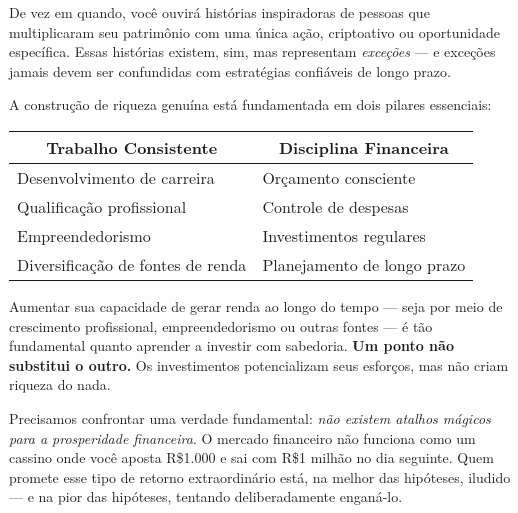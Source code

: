 \vspace{0.5cm}
\noindent De vez em quando, você ouvirá histórias inspiradoras de pessoas que multiplicaram seu patrimônio com uma única ação, criptoativo ou oportunidade específica. Essas histórias existem, sim, mas representam \textit{exceções} — e exceções jamais devem ser confundidas com estratégias confiáveis de longo prazo.

\vspace{0.5cm}
\noindent A construção de riqueza genuína está fundamentada em dois pilares essenciais:

\begin{center}
\begin{tabular}{p{} p{}}
\hline
\multicolumn{1}{c}{\textbf{Trabalho Consistente}} & \multicolumn{1}{c}{\textbf{Disciplina Financeira}} \\
\hline
Desenvolvimento de carreira & Orçamento consciente \\
Qualificação profissional & Controle de despesas \\
Empreendedorismo & Investimentos regulares \\
Diversificação de fontes de renda & Planejamento de longo prazo \\
\hline
\end{tabular}
\end{center}

\vspace{0.5cm}
\noindent Aumentar sua capacidade de gerar renda ao longo do tempo — seja por meio de crescimento profissional, empreendedorismo ou outras fontes — é tão fundamental quanto aprender a investir com sabedoria. \textbf{Um ponto não substitui o outro.} Os investimentos potencializam seus esforços, mas não criam riqueza do nada.

\vspace{0.5cm}
\noindent Precisamos confrontar uma verdade fundamental: \textit{não existem atalhos mágicos para a prosperidade financeira}. O mercado financeiro não funciona como um cassino onde você aposta R\$1.000 e sai com R\$1 milhão no dia seguinte. Quem promete esse tipo de retorno extraordinário está, na melhor das hipóteses, iludido — e na pior das hipóteses, tentando deliberadamente enganá-lo.

\vspace{0.8cm}
\begin{center}
\end{center}

